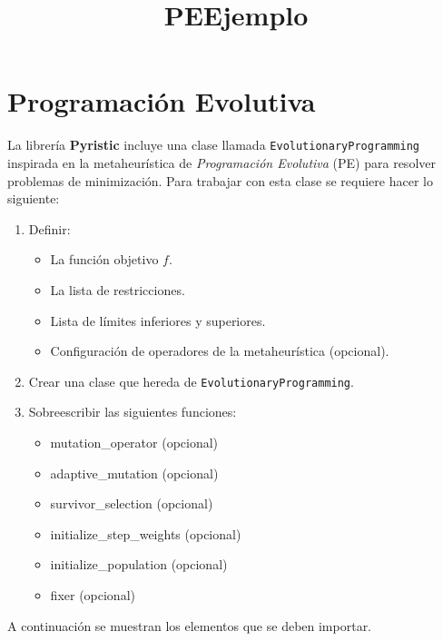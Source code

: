 \documentclass[11pt]{article}
\title{PEEjemplo}
\providecommand{\tightlist}{%
      \setlength{\itemsep}{0pt}\setlength{\parskip}{0pt}}
\begin{document}
    
    
    \maketitle
    
    

    
    \section{Programación Evolutiva}\label{programaciuxf3n-evolutiva}

La librería \textbf{Pyristic} incluye una clase llamada
\texttt{EvolutionaryProgramming} inspirada en la metaheurística de
\emph{Programación Evolutiva} (PE) para resolver problemas de
minimización. Para trabajar con esta clase se requiere hacer lo
siguiente:

\begin{enumerate}
\def\labelenumi{\arabic{enumi}.}
\item
  Definir:

  \begin{itemize}
  \tightlist
  \item
    La función objetivo \(f\).
  \item
    La lista de restricciones.
  \item
    Lista de límites inferiores y superiores.
  \item
    Configuración de operadores de la metaheurística (opcional).
  \end{itemize}
\item
  Crear una clase que hereda de \texttt{EvolutionaryProgramming}.
\item
  Sobreescribir las siguientes funciones:

  \begin{itemize}
  \tightlist
  \item
    mutation\_operator (opcional)
  \item
    adaptive\_mutation (opcional)
  \item
    survivor\_selection (opcional)
  \item
    initialize\_step\_weights (opcional)
  \item
    initialize\_population (opcional)
  \item
    fixer (opcional)
  \end{itemize}
\end{enumerate}

A continuación se muestran los elementos que se deben importar.
\end{document}
